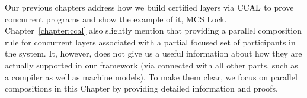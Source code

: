 
Our previous chapters address how we build 
certified layers via $\mathrm{CCAL}$ to prove concurrent programs and show the example of it, MCS Lock. 
Chapter~\ref{chapter:ccal} also slightly mention that 
providing a  parallel composition rule for 
concurrent layers associated with a partial focused set of participants in the system. 
It, however, does not give us a useful information 
about how they are actually supported in our framework (via connected with all other parts, such as a compiler 
as well as machine models). 
To make them clear, 
we focus on parallel compositions in this Chapter 
by providing 
detailed information and proofs. 







